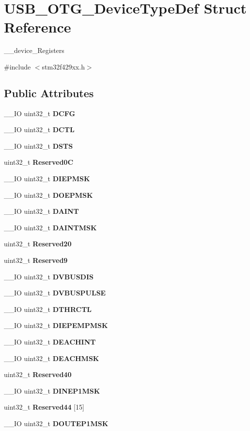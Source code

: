 \section{U\+S\+B\+\_\+\+O\+T\+G\+\_\+\+Device\+Type\+Def Struct Reference}
\label{structUSB__OTG__DeviceTypeDef}


\+\_\+\+\_\+device\+\_\+\+Registers  




{\ttfamily \#include $<$stm32f429xx.\+h$>$}

\subsection*{Public Attributes}
\begin{DoxyCompactItemize}
\item 
\+\_\+\+\_\+\+IO uint32\+\_\+t \textbf{ D\+C\+FG}
\item 
\+\_\+\+\_\+\+IO uint32\+\_\+t \textbf{ D\+C\+TL}
\item 
\+\_\+\+\_\+\+IO uint32\+\_\+t \textbf{ D\+S\+TS}
\item 
uint32\+\_\+t \textbf{ Reserved0C}
\item 
\+\_\+\+\_\+\+IO uint32\+\_\+t \textbf{ D\+I\+E\+P\+M\+SK}
\item 
\+\_\+\+\_\+\+IO uint32\+\_\+t \textbf{ D\+O\+E\+P\+M\+SK}
\item 
\+\_\+\+\_\+\+IO uint32\+\_\+t \textbf{ D\+A\+I\+NT}
\item 
\+\_\+\+\_\+\+IO uint32\+\_\+t \textbf{ D\+A\+I\+N\+T\+M\+SK}
\item 
uint32\+\_\+t \textbf{ Reserved20}
\item 
uint32\+\_\+t \textbf{ Reserved9}
\item 
\+\_\+\+\_\+\+IO uint32\+\_\+t \textbf{ D\+V\+B\+U\+S\+D\+IS}
\item 
\+\_\+\+\_\+\+IO uint32\+\_\+t \textbf{ D\+V\+B\+U\+S\+P\+U\+L\+SE}
\item 
\+\_\+\+\_\+\+IO uint32\+\_\+t \textbf{ D\+T\+H\+R\+C\+TL}
\item 
\+\_\+\+\_\+\+IO uint32\+\_\+t \textbf{ D\+I\+E\+P\+E\+M\+P\+M\+SK}
\item 
\+\_\+\+\_\+\+IO uint32\+\_\+t \textbf{ D\+E\+A\+C\+H\+I\+NT}
\item 
\+\_\+\+\_\+\+IO uint32\+\_\+t \textbf{ D\+E\+A\+C\+H\+M\+SK}
\item 
uint32\+\_\+t \textbf{ Reserved40}
\item 
\+\_\+\+\_\+\+IO uint32\+\_\+t \textbf{ D\+I\+N\+E\+P1\+M\+SK}
\item 
uint32\+\_\+t \textbf{ Reserved44} [15]
\item 
\+\_\+\+\_\+\+IO uint32\+\_\+t \textbf{ D\+O\+U\+T\+E\+P1\+M\+SK}
\end{DoxyCompactItemize}


